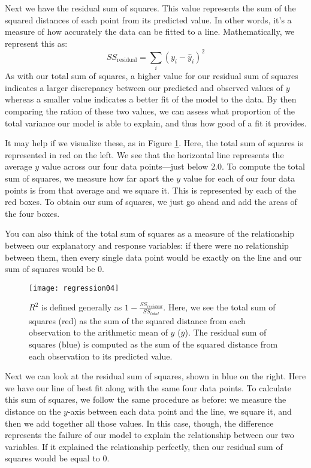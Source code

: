 Next we have the residual sum of squares. This value represents the sum of the squared distances of each point from its predicted value. In other words, it's a measure of how accurately the data can be fitted to a line. Mathematically, we represent this as:
\begin{equation*}
SS_\text{residual}=\sum_i \left(y_i - \hat{y}_i\right)^2
\end{equation*}
As with our total sum of squares, a higher value for our residual sum of squares indicates a larger discrepancy between our predicted and observed values of $y$ whereas a smaller value indicates a better fit of the model to the data. By then comparing the ration of these two values, we can assess what proportion of the total variance our model is able to explain, and thus how good of a fit it provides.

It may help if we visualize these, as in Figure \ref{fig:regression04}. Here, the total sum of squares is represented in red on the left.  We see that the horizontal line represents the average $y$ value across our four data points---just below $2.0$. To compute the total sum of squares, we measure how far apart the $y$ value for each of our four data points is from that average and we square it. This is represented by each of the red boxes. To obtain our sum of squares, we just go ahead and add the areas of the four boxes.

You can also think of the total sum of squares as a measure of the relationship between our explanatory and response variables: if there were no relationship between them, then every single data point would be exactly on the line and our sum of squares would be $0$.

\begin{figure}[h]
\texttt{[image: regression04]}
\label{fig:regression04}
\caption{$R^2$ is defined generally as $1-\frac{SS_{residual}}{SS_{total}}$. Here, we see the total sum of squares (red) as the sum of the squared distance from each observation to the arithmetic mean of $y$ ($\bar{y}$). The residual sum of squares (blue) is computed as the sum of the squared distance from each observation to its predicted value.}
\end{figure}

Next we can look at the residual sum of squares, shown in blue on the right. Here we have our line of best fit along with the same four data points. To calculate this sum of squares, we follow the same procedure as before: we measure the distance on the $y$-axis between each data point and the line, we square it, and then we add together all those values. In this case, though, the difference represents the failure of our model to explain the relationship between our two variables. If it explained the relationship perfectly, then our residual sum of squares would be equal to 0.

